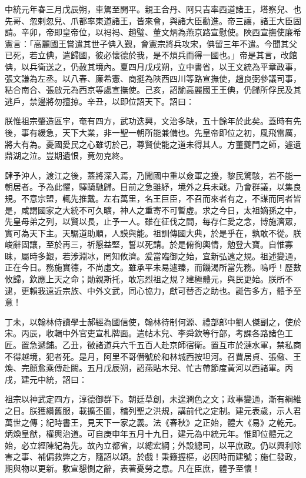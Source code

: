 \begin{pinyinscope}
 中統元年春三月戊辰朔，車駕至開平。親王合丹、阿只吉率西道諸王，塔察兒、也先哥、忽剌忽兒、爪都率東道諸王，皆來會，與諸大臣勸進。帝三讓，諸王大臣固請。辛卯，帝即皇帝位，以祃祃、趙璧、董文炳為燕京路宣慰使。陜西宣撫使廉希憲言：「高麗國王嘗遣其世子倎入覲，會憲宗將兵攻宋，倎留三年不遣。今聞其父已死，若立倎，遣歸國，彼必懷德於我，是不煩兵而得一國也。」帝是其言，改館倎，以兵衛送之，仍赦其境內。夏四月戊戌朔，立中書省，以王文統為平章政事，張文謙為左丞。以八春、廉希憲、商挺為陜西四川等路宣撫使，趙良弼參議司事，粘合南合、張啟元為西京等處宣撫使。己亥，詔諭高麗國王王倎，仍歸所俘民及其逃戶，禁邊將勿擅掠。辛丑，以即位詔天下。詔曰：



 朕惟祖宗肇造區宇，奄有四方，武功迭興，文治多缺，五十餘年於此矣。蓋時有先後，事有緩急，天下大業，非一聖一朝所能兼備也。先皇帝即位之初，風飛雷厲，將大有為。憂國愛民之心雖切於己，尊賢使能之道未得其人。方董夔門之師，遽遺鼎湖之泣。豈期遺恨，竟勿克終。



 肆予沖人，渡江之後，蓋將深入焉，乃聞國中重以僉軍之擾，黎民驚駭，若不能一朝居者。予為此懼，驛騎馳歸。目前之急雖紓，境外之兵未戢。乃會群議，以集良規。不意宗盟，輒先推戴。左右萬里，名王巨臣，不召而來者有之，不謀而同者皆是，咸謂國家之大統不可久曠，神人之重寄不可暫虛。求之今日，太祖嫡孫之中，先皇母弟之列，以賢以長，止予一人。雖在征伐之間，每存仁愛之念，博施濟眾，實可為天下主。天驏道助順，人謨與能。祖訓傳國大典，於是乎在，孰敢不從。朕峻辭固讓，至於再三，祈懇益堅，誓以死請。於是俯徇輿情，勉登大寶。自惟寡昧，屬時多艱，若涉淵冰，罔知攸濟。爰當臨御之始，宜新弘遠之規。祖述變通，正在今日。務施實德，不尚虛文。雖承平未易遽臻，而饑渴所當先務。嗚呼！歷數攸歸，欽應上天之命；勛親斯托，敢忘烈祖之規？建極體元，與民更始。朕所不逮，更賴我遠近宗族、中外文武，同心協力，獻可替否之助也。誕告多方，體予至意！



 丁未，以翰林侍讀學士郝經為國信使，翰林待制何源、禮部郎中劉人傑副之，使於宋。丙辰，收輯中外官吏宣札牌面。遣帖木兒、李舜欽等行部，考課各路諸色工匠。置急遞鋪。乙丑，徵諸道兵六千五百人赴京師宿衛。置互市於漣水軍，禁私商不得越境，犯者死。是月，阿里不哥僭號於和林城西按坦河。召賈居貞、張儆、王煥、完顏愈乘傳赴闕。五月戊辰朔，詔燕貼木兒、忙古帶節度黃河以西諸軍。丙戌，建元中統，詔曰：



 祖宗以神武定四方，淳德御群下。朝廷草創，未遑潤色之文；政事變通，漸有綱維之目。朕獲纘舊服，載擴丕圖，稽列聖之洪規，講前代之定制。建元表歲，示人君萬世之傳；紀時書王，見天下一家之義。法《春秋》之正始，體大《易》之乾元。炳煥皇猷，權輿治道。可自庚申年五月十九日，建元為中統元年。惟即位體元之始，必立經陳紀為先。故內立都省，以總宏綱；外設總司，以平庶政。仍以興利除害之事、補偏救弊之方，隨詔以頌。於戲！秉籙握樞，必因時而建號；施仁發政，期與物以更新。敷宣懇惻之辭，表著憂勞之意。凡在臣庶，體予至懷！




\end{pinyinscope}
